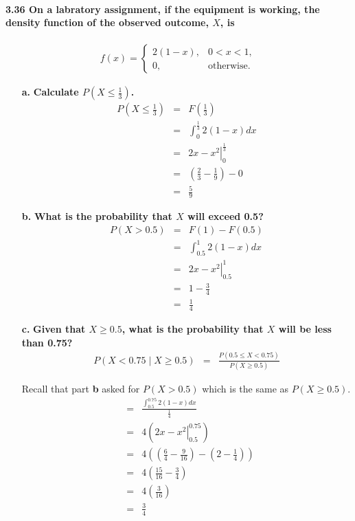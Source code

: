 \documentclass{article}
\begin{document}
\paragraph{3.36 On a labratory assignment, if the equipment is working, the
density function of the observed outcome, $X$, is}
\begin{eqnarray*}
f(x)= \left\{ \begin{array}{ll}
	2(1-x), & 0<x<1,\\
	0, & \mbox{otherwise}.
	\end{array} \right.
\end{eqnarray*}
\begin{enumerate}
\item[\textbf{a.}] \textbf{Calculate $P(X \leq \frac{1}{3})$.}
\begin{eqnarray*}
P(X \leq \frac{1}{3}) & = & F(\frac{1}{3})\\
 & = & \int_{0}^{\frac{1}{3}} 2(1-x)dx\\
 & = & \left. 2x-x^2 \right|_{0}^{\frac{1}{3}}\\
 & = & \left(\frac{2}{3}-\frac{1}{9}\right) - 0\\
 & = & \frac{5}{9}
\end{eqnarray*}

\item[\textbf{b.}] \textbf{What is the probability that $X$ will exceed 0.5?}
\begin{eqnarray*}
P(X>0.5) & = & F(1)-F(0.5)\\
	& = & \int_{0.5}^{1} 2(1-x)dx\\
	& = & \left. 2x-x^2 \right|_{0.5}^{1}\\
	& = & 1 - \frac{3}{4}\\
	& = & \frac{1}{4}
\end{eqnarray*}

\item[\textbf{c.}] \textbf{Given that $X \geq 0.5$, what is the probability 
that $X$ will be less than 0.75?}
\begin{eqnarray*}
P(X<0.75 \mid X \geq 0.5) & = & \frac{P(0.5 \leq X < 0.75)}{P(X \geq 0.5)}
\end{eqnarray*}

Recall that part \textbf{b} asked for $P(X>0.5)$ which is the same as
$P(X \geq 0.5)$.
\begin{eqnarray*}
	& = & \frac{\int_{0.5}^{0.75} 2(1-x)dx}{\frac{1}{4}}\\
	& = & 4(\left. 2x-x^2 \right|_{0.5}^{0.75})\\
	& = & 4\left(\left(\frac{6}{4}-\frac{9}{16}\right)-
		\left(2-\frac{1}{4}\right)\right)\\
	& = & 4\left(\frac{15}{16}-\frac{3}{4}\right)\\
	& = & 4\left(\frac{3}{16}\right)\\
	& = & \frac{3}{4}
\end{eqnarray*}
\end{enumerate}
\end{document}
